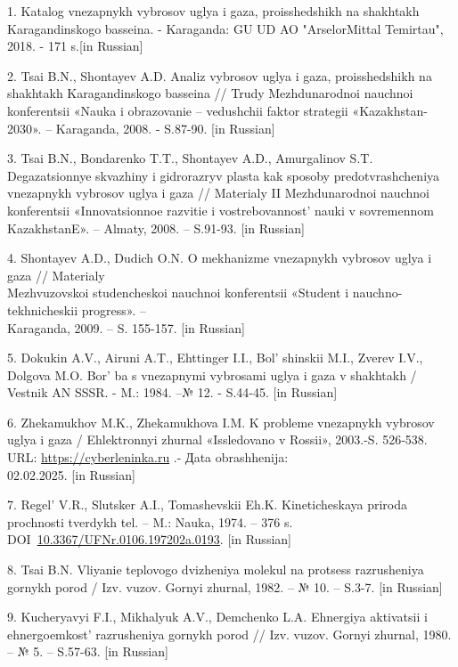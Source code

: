 \begin{references}
1. Katalog vnezapnykh vybrosov uglya i gaza, proisshedshikh na shakhtakh
Karagandinskogo basseina. - Karaganda: GU UD AO "ArselorMittal
Temirtau", 2018. - 171 s.{[}in Russian{]}

2. Tsai B.N., Shontayev A.D. Analiz vybrosov uglya i gaza, proisshedshikh
na shakhtakh Karagandinskogo basseina // Trudy Mezhdunarodnoi nauchnoi
konferentsii «Nauka i obrazovanie -- vedushchii faktor strategii
«Kazakhstan-2030». -- Karaganda, 2008. - S.87-90. {[}in Russian{]}

3. Tsai B.N., Bondarenko T.T., Shontayev A.D., Amurgalinov S.T.
Degazatsionnye skvazhiny i gidrorazryv plasta kak sposoby
predotvrashcheniya vnezapnykh vybrosov uglya i gaza // Materialy II
Mezhdunarodnoi nauchnoi konferentsii «Innovatsionnoe razvitie i
vostrebovannost'{} nauki v sovremennom KazakhstanE». --
Almaty, 2008. -- S.91-93. {[}in Russian{]}

4. Shontayev A.D., Dudich O.N. O mekhanizme vnezapnykh vybrosov uglya i
gaza // Materialy \\Mezhvuzovskoi studencheskoi nauchnoi konferentsii
«Student i nauchno-tekhnicheskii progress». -- \\Karaganda, 2009. -- S.
155-157. {[}in Russian{]}

5. Dokukin A.V., Airuni A.T., Ehttinger I.I.,
Bol' shinskii M.I., Zverev I.V., Dolgova M.O.
Bor' ba s vnezapnymi vybrosami uglya i gaza v shakhtakh /
Vestnik AN SSSR. - M.: 1984. --№ 12. - S.44‑45. {[}in Russian{]}

6. Zhekamukhov M.K., Zhekamukhova I.M. K probleme vnezapnykh vybrosov
uglya i gaza / Ehlektronnyi zhurnal «Issledovano v Rossii», 2003.-S.
526‑538. URL: \href{https://cyberleninka.ru/article/n/k-probleme-vnezapnyh-vybrosov-uglya-i-gaza-v-shahtah}{https://cyberleninka.ru} .- Дata
obrashhenija: \\02.02.2025. {[}in Russian{]}

7. Regel'{} V.R., Slutsker A.I., Tomashevskii Eh.K.
Kineticheskaya priroda prochnosti tverdykh tel. -- M.: Nauka, 1974. --
376 s.
DOI~\href{https://doi.org/10.3367/UFNr.0106.197202a.0193}{10.3367/UFNr.0106.197202a.0193}.
{[}in Russian{]}

8. Tsai B.N. Vliyanie teplovogo dvizheniya molekul na protsess
razrusheniya gornykh porod / Izv. vuzov. Gornyi zhurnal, 1982. -- № 10.
-- S.3-7. {[}in Russian{]}

9. Kucheryavyi F.I., Mikhalyuk A.V., Demchenko L.A. Ehnergiya aktivatsii
i ehnergoemkost'{} razrusheniya gornykh porod // Izv.
vuzov. Gornyi zhurnal, 1980. -- № 5. -- S.57-63. {[}in Russian{]}


\end{references}
